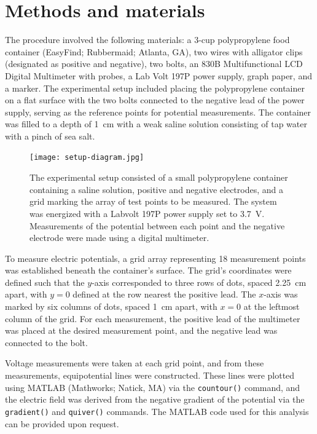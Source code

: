 ﻿\documentclass[10pt,journal,twoside]{IEEEtran}
\begin{document}
 \section{Methods and materials}
The procedure involved the following materials: a 3-cup polypropylene food container (EasyFind; Rubbermaid; Atlanta, GA), two wires with alligator clips (designated as positive and negative), two bolts, an 830B Multifunctional LCD Digital Multimeter with probes, a Lab Volt 197P power supply, graph paper, and a marker. The experimental setup included placing the polypropylene container on a flat surface with the two bolts connected to the negative lead of the power supply, serving as the reference points for potential measurements. The container was filled to a depth of \qty{1}{\centi\meter} with a weak saline solution consisting of tap water with a pinch of sea salt.                          
\begin{figure}
\begin{center}
\texttt{[image: setup-diagram.jpg]}
\end{center}
\caption{The experimental setup consisted of a small polypropylene container containing a saline solution, positive and negative electrodes, and a grid marking the  array of test points to be measured. The system was energized with a Labvolt 197P power supply set to \qty{3.7}{\volt}. Measurements of the potential between each point and the negative electrode were made using a digital multimeter.}
\label{fig:1}
\end{figure}

To measure electric potentials, a  grid array representing 18 measurement points was established beneath the container’s surface. The grid's coordinates were defined such that the $y$-axis corresponded to three rows of dots, spaced \qty{2.25}{\centi\meter} apart, with $y=0$ defined at the row nearest the positive lead. The $x$-axis was marked by six columns of dots, spaced \qty{1}{\centi\meter} apart, with $x=0$ at the leftmost column of the grid. For each measurement, the positive lead of the multimeter was placed at the desired measurement point, and the negative lead was connected to the bolt.

Voltage measurements were taken at each grid point, and from these measurements, equipotential lines were constructed. These lines were plotted using MATLAB (Mathworks; Natick, MA) via the \texttt{countour()} command, and the electric field was derived from the negative gradient of the potential via the \texttt{gradient()} and \texttt{quiver()} commands. The MATLAB code used for this analysis can be provided upon request.
\end{document}

